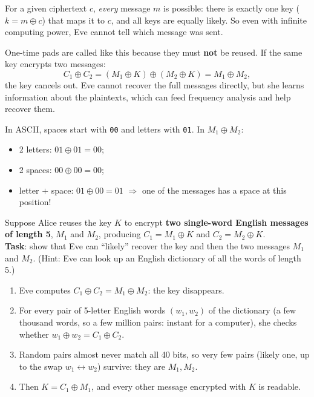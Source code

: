 \begin{rembox}[title=Intuition]
For a given ciphertext $c$, \emph{every} message $m$ is possible: there is exactly one key
($k = m \oplus c$) that maps it to $c$, and all keys are equally likely. So even with
infinite computing power, Eve cannot tell which message was sent.
\end{rembox}

\begin{defnbox}[title={One-time: never reuse the key}]
One-time pads are called like this because they must \textbf{not} be reused. If the same
key encrypts two messages:
\[
  C_1 \oplus C_2 = (M_1 \oplus K) \oplus (M_2 \oplus K) = M_1 \oplus M_2 ,
\]
the key cancels out. Eve cannot recover the full messages directly, but she learns
information about the plaintexts, which can feed frequency analysis and help recover
them.
\end{defnbox}

\begin{exbox}[title=Spaces vs.\ letters in ASCII]
In ASCII, spaces start with \texttt{00} and letters with \texttt{01}. In $M_1 \oplus M_2$:
\begin{itemize}
  \item 2 letters: $01 \oplus 01 = 00$;
  \item 2 spaces: $00 \oplus 00 = 00$;
  \item letter $+$ space: $01 \oplus 00 = 01$ $\Rightarrow$ one of the messages has a
        space at this position!
\end{itemize}
\end{exbox}

\begin{exbox}[title={Exercise --- Key reuse}]
Suppose Alice reuses the key $K$ to encrypt \textbf{two single-word English messages of
length 5}, $M_1$ and $M_2$, producing $C_1 = M_1 \oplus K$ and $C_2 = M_2 \oplus K$. \\
\textbf{Task}: show that Eve can ``likely'' recover the key and then the two messages
$M_1$ and $M_2$. (Hint: Eve can look up an English dictionary of all the words of
length 5.)
\end{exbox}

\begin{algbox}[title={Solution --- Key reuse}]
\begin{enumerate}
  \item Eve computes $C_1 \oplus C_2 = M_1 \oplus M_2$: the key disappears.
  \item For every pair of 5-letter English words $(w_1, w_2)$ of the dictionary (a few thousand
        words, so a few million pairs: instant for a computer), she checks whether
        $w_1 \oplus w_2 = C_1 \oplus C_2$.
  \item Random pairs almost never match all 40 bits, so very few pairs (likely one, up to the
        swap $w_1 \leftrightarrow w_2$) survive: they are $M_1, M_2$.
  \item Then $K = C_1 \oplus M_1$, and every other message encrypted with $K$ is readable.
\end{enumerate}
\end{algbox}

